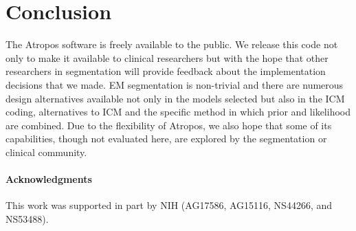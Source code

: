 \documentclass[11pt,english]{article}
\begin{document}
\section{Conclusion}
The Atropos software is freely available to the public.  We release
this code not only to make it available to clinical researchers but
with the hope that other researchers in segmentation will provide
feedback about the implementation decisions that we made.  EM
segmentation is non-trivial and there are numerous design alternatives
available not only in the models selected but also in the ICM coding, alternatives to ICM and the specific method in which prior
and likelihood are combined.  Due to the flexibility of Atropos, we
also hope that some of its capabilities, though not evaluated here,
are explored by the segmentation or clinical community.

\paragraph{Acknowledgments}
{This work was supported in part by NIH (AG17586, AG15116, NS44266, and
NS53488).}

\newpage


 
\end{document}

